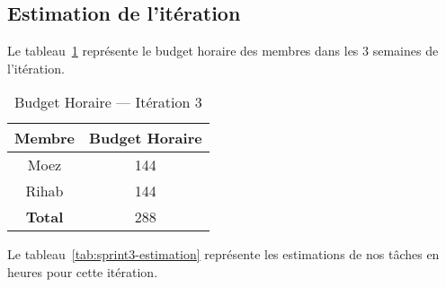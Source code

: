 \subsection{Estimation de l'itération}

Le tableau~\ref{tab:sprint3-capacity} représente le budget horaire des membres
dans les 3 semaines de l'itération.

\begin{table}[H]
    \centering
    \begin{tabular}{| c | c |}
\hline
\textbf{Membre} & \textbf{Budget Horaire} \\ \hline
\hline

Moez & 144\\ \hline
Rihab & 144 \\ \hline
\textbf{Total} & 288 \\ \hline
    \end{tabular}
    \caption{Budget Horaire --- Itération 3}
\label{tab:sprint3-capacity}
\end{table}

Le tableau~\ref{tab:sprint3-estimation} représente les estimations de nos tâches
en heures pour cette itération.

